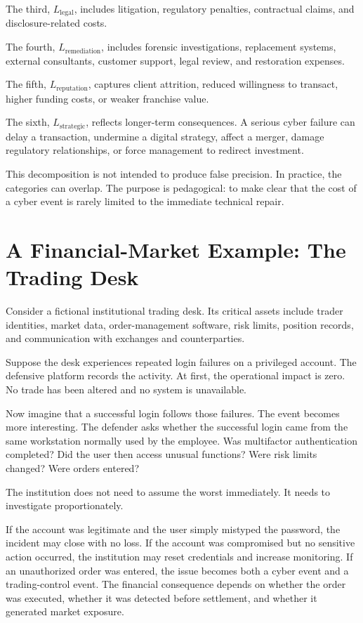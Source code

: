 The third, $L_{\text{legal}}$, includes litigation, regulatory penalties, contractual claims, and disclosure-related costs.

The fourth, $L_{\text{remediation}}$, includes forensic investigations, replacement systems, external consultants, customer support, legal review, and restoration expenses.

The fifth, $L_{\text{reputation}}$, captures client attrition, reduced willingness to transact, higher funding costs, or weaker franchise value.

The sixth, $L_{\text{strategic}}$, reflects longer-term consequences. A serious cyber failure can delay a transaction, undermine a digital strategy, affect a merger, damage regulatory relationships, or force management to redirect investment.

This decomposition is not intended to produce false precision. In practice, the categories can overlap. The purpose is pedagogical: to make clear that the cost of a cyber event is rarely limited to the immediate technical repair.

\section{A Financial-Market Example: The Trading Desk}

Consider a fictional institutional trading desk. Its critical assets include trader identities, market data, order-management software, risk limits, position records, and communication with exchanges and counterparties.

Suppose the desk experiences repeated login failures on a privileged account. The defensive platform records the activity. At first, the operational impact is zero. No trade has been altered and no system is unavailable.

Now imagine that a successful login follows those failures. The event becomes more interesting. The defender asks whether the successful login came from the same workstation normally used by the employee. Was multifactor authentication completed? Did the user then access unusual functions? Were risk limits changed? Were orders entered?

The institution does not need to assume the worst immediately. It needs to investigate proportionately.

If the account was legitimate and the user simply mistyped the password, the incident may close with no loss. If the account was compromised but no sensitive action occurred, the institution may reset credentials and increase monitoring. If an unauthorized order was entered, the issue becomes both a cyber event and a trading-control event. The financial consequence depends on whether the order was executed, whether it was detected before settlement, and whether it generated market exposure.

